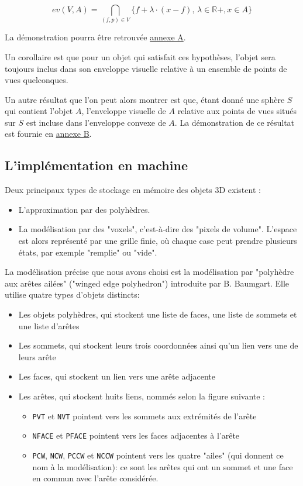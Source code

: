 \documentclass[a4paper]{article}
\begin{document}
      \[
      ev(V, A) = \bigcap_{(f, p) \in V} \{f + \lambda \cdot (x - f), \, \lambda \in \mathbb{R}+, x \in A\}
      \]

      La démonstration pourra être retrouvée \hyperref[AnnexeA]{annexe A}.

      Un corollaire est que pour un objet qui satisfait ces hypothèses, l'objet sera toujours inclus dans son enveloppe visuelle relative à un ensemble de points de vues quelconques.

      Un autre résultat que l'on peut alors montrer est que, étant donné une sphère $S$ qui contient l'objet $A$, l'enveloppe visuelle de $A$ relative aux points de vues situés sur $S$ est  incluse dans l'enveloppe convexe de $A$. La démonstration de ce résultat est fournie en \hyperref[AnnexeB]{annexe B}.

    \subsection{L'implémentation en machine}
      Deux principaux types de stockage en mémoire des objets 3D existent :
      \begin{itemize}
        \item L'approximation par des polyhèdres.
        \item La modélisation par des "voxels", c'est-à-dire des "pixels de volume". L'espace est alors représenté par une grille finie, où chaque case peut prendre plusieurs états, par exemple "remplie" ou "vide".
      \end{itemize}
      
      La modélisation précise que nous avons choisi est la modélisation par "polyhèdre aux arêtes ailées" ("winged edge polyhedron") introduite par B. Baumgart. Elle utilise quatre types d'objets distincts:
      \begin{itemize}
        \item Les objets polyhèdres, qui stockent une liste de faces, une liste de sommets et une liste d'arêtes
        \item Les sommets, qui stockent leurs trois coordonnées ainsi qu'un lien vers une de leurs arête
        \item Les faces, qui stockent un lien vers une arête adjacente
        \item Les arêtes, qui stockent huits liens, nommés selon la figure suivante :
        \begin{itemize}
          \item \texttt{PVT} et \texttt{NVT} pointent vers les sommets aux extrémités de l'arête
          \item \texttt{NFACE} et \texttt{PFACE} pointent vers les faces adjacentes à l'arête
          \item \texttt{PCW}, \texttt{NCW}, \texttt{PCCW} et \texttt{NCCW} pointent vers les quatre "ailes" (qui donnent ce nom à la modélisation): ce sont les arêtes qui ont un sommet et une face en commun avec l'arête considérée.
        \end{itemize}
      \end{itemize}
\end{document}
